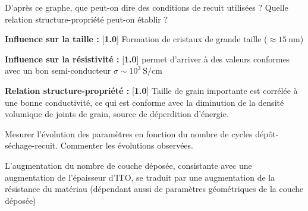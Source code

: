 \begin{questions}
\question[3] D'après ce graphe, que peut-on dire des conditions de recuit utilisées ? Quelle relation structure-propriété peut-on établir ?

\begin{mybox}
\begin{solution}[5cm]

\textbf{Influence sur la taille :} [\textbf{1.0}] Formation de cristaux de grande taille ($\approx 15 ~ \si{\nano\meter}$)

\textbf{Influence sur la résistivité :} [\textbf{1.0}] permet d'arriver à des valeurs conformes avec un bon semi-conducteur $\sigma \sim 10^3 ~ \si{\siemens\per\centi\meter}$

\textbf{Relation structure-propriété :} [\textbf{1.0}] Taille de grain importante est corrélée à une bonne conductivité, ce qui est conforme avec la diminution de la densité volumique de joints de grain, source de déperdition d'énergie.

\end{solution}
\end{mybox}

\question[2] Mesurer l'évolution des paramètres en fonction du nombre de cycles dépôt-séchage-recuit. Commenter les évolutions observées.

\begin{mybox}
\begin{solution}[5cm]

L'augmentation du nombre de couche déposée, consistante avec une augmentation de l'épaisseur d'ITO, se traduit par une augmentation de la résistance du matériau (dépendant aussi de paramètres géométriques de la couche déposée)

\end{solution}
\end{mybox}

\setcounter{foo}{\thequestion}
\end{questions}

